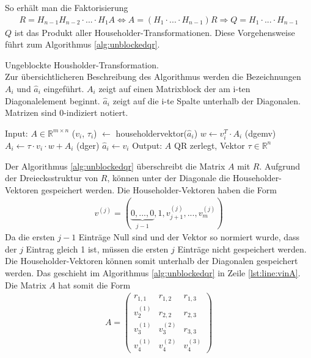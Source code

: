 So erhält man die Faktorisierung
\begin{align*}
R = H_{n-1} H_{n-2}\cdot ...\cdot H_1 A \Leftrightarrow A = (H_1\cdot ...\cdot H_{n-1})R \Rightarrow Q = H_1\cdot ... \cdot H_{n-1}
\end{align*}
$Q$ ist das Produkt aller Householder-Transformationen.
Diese Vorgehensweise führt zum Algorithmus \ref{alg:unblockedqr}. 
\begin{algorithm}[H]
	\caption{Ungeblockte Housholder-Transformation. \\
		Zur übersichtlicheren Beschreibung des Algorithmus werden die Bezeichnungen $A_i$ und $\hat{a}_i$ eingeführt.	$A_i$ zeigt auf einen Matrixblock der am i-ten Diagonalelement beginnt. $\hat{a}_i$ zeigt auf die i-te Spalte unterhalb der Diagonalen. Matrizen sind 0-indiziert notiert.}
	\begin{algorithmic}[1]
	\State Input: $A \in \mathbb{R}^{m \times n}$
		\State ($v_i$, $\tau_i$) $\leftarrow$ householdervektor($\hat{a}_i$)
		\State $w \leftarrow v_i^T \cdot A_i$ (dgemv)
		\State $ A_i \leftarrow \tau \cdot v_i \cdot w + A_i $ (dger)
			\State $\hat{a}_i \leftarrow v_i$ \label{lst:line:vinA}
		\EndIf
	\EndFor	
	\State Output: $A$ QR zerlegt, Vektor $\tau \in \mathbb{R}^n$
\end{algorithmic} 
\label{alg:unblockedqr}
\end{algorithm}

Der Algorithmus \ref{alg:unblockedqr} überschreibt die Matrix $A$ mit $R$.
Aufgrund der Dreiecksstruktur von $R$,
können unter der Diagonale die Householder-Vektoren gespeichert werden. 
Die Householder-Vektoren haben die Form 
\begin{align*}
v^{(j)} = ( \underbrace{0,...,0}_{j-1},1,	v_{j+1}^{(j)},...,v_{m}^{(j)}  )
\end{align*}
Da die ersten $j-1$ Einträge Null sind und der Vektor so normiert wurde, dass der $j$ Eintrag gleich 1 ist, müssen die ersten $j$ Einträge nicht gespeichert werden.
Die Householder-Vektoren können somit unterhalb der Diagonalen gespeichert werden. Das geschieht im Algorithmus \ref{alg:unblockedqr} in Zeile \ref{lst:line:vinA}.
Die Matrix $A$ hat somit die Form
\begin{align*}
	A = 
	\left(\begin{array}{ccc}
	r_{1,1}   &  r_{1,2}  & r_{1,3} \\ 
	v_2^{(1)} &  r_{2,2}  & r_{2,3} \\ 
	v_3^{(1)} & v_3^{(2)} & r_{3,3} \\ 
	v_4^{(1)} & v_4^{(2)} & v_4^{(3)}
	\end{array} \right) 
\end{align*}

